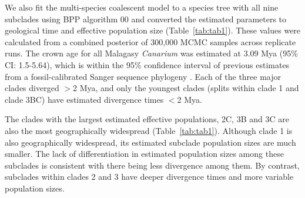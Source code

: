\documentclass[10pt,letterpaper]{article}
\begin{document}
We also fit the multi-species coalescent model to a species tree with all nine subclades using BPP algorithm 00 and converted the estimated parameters to geological time and effective population size (Table~\ref{tab:tab1}). These values were calculated from a combined posterior of 300,000 MCMC samples across replicate runs. The crown age for all Malagasy \emph{Canarium} was estimated at 3.09 Mya (95\% CI: 1.5-5.64), which is within the 95\% confidence interval of previous estimates from a fossil-calibrated Sanger sequence phylogeny 
\cite{federman_biogeographic_2015}. Each of the three major clades diverged $>$2 Mya, and only the youngest clades (splits within clade 1 and clade 3BC) have estimated divergence times $<$2 Mya.   

The clades with the largest estimated effective populations, 2C, 3B and 3C are also the most geographically widespread (Table~\ref{tab:tab1}). Although clade 1 is also geographically widespread, its estimated subclade population sizes are much smaller. The lack of differentiation in estimated population sizes among these subclades is consistent with there being less divergence among them. By contrast, subclades within clades 2 and 3 have deeper divergence times and more variable population sizes.
\end{document}
